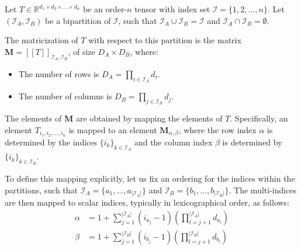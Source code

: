 \documentclass[../../main.tex]{subfiles}
\begin{document}
\begin{definition}
Let $T \in \mathbb{R}^{d_1 \times d_2 \times \dots \times d_n}$ be an order-$n$ tensor with index set $\mathcal{I} = \{1, 2, \dots, n\}$. Let $(\mathcal{I}_A, \mathcal{I}_B)$ be a bipartition of $\mathcal{I}$, such that $\mathcal{I}_A \cup \mathcal{I}_B = \mathcal{I}$ and $\mathcal{I}_A \cap \mathcal{I}_B = \emptyset$.

The matricization of $T$ with respect to this partition is the matrix $\bm{M} = [[T]]_{\mathcal{I}_A, \mathcal{I}_B}$, of size $D_A \times D_B$, where:
\begin{itemize}
    \item The number of rows is $D_A = \prod_{i \in \mathcal{I}_A} d_i$.
    \item The number of columns is $D_B = \prod_{j \in \mathcal{I}_B} d_j$.
\end{itemize}
The elements of $\bm{M}$ are obtained by mapping the elements of $T$. Specifically, an element $T_{i_1, i_2, \dots, i_n}$ is mapped to an element $\bm{M}_{\alpha, \beta}$, where the row index $\alpha$ is determined by the indices $\{i_k\}_{k \in \mathcal{I}_A}$ and the column index $\beta$ is determined by $\{i_k\}_{k \in \mathcal{I}_B}$.

To define this mapping explicitly, let us fix an ordering for the indices within the partitions, such that $\mathcal{I}_A = \{a_1, \dots, a_{|\mathcal{I}_A|}\}$ and $\mathcal{I}_B = \{b_1, \dots, b_{|\mathcal{I}_B|}\}$. The multi-indices are then mapped to scalar indices, typically in lexicographical order, as follows:
\begin{align*}
    \alpha &= 1 + \sum_{j=1}^{|\mathcal{I}_A|} (i_{a_j} - 1) \left( \prod_{l=j+1}^{|\mathcal{I}_A|} d_{a_l} \right) \\
    \beta  &= 1 + \sum_{j=1}^{|\mathcal{I}_B|} (i_{b_j} - 1) \left( \prod_{l=j+1}^{|\mathcal{I}_B|} d_{b_l} \right)
\end{align*}
\end{definition}



\end{document}
